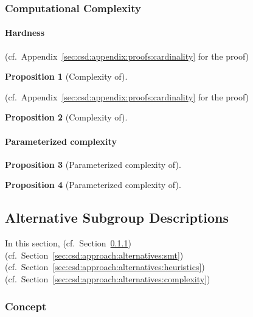 \documentclass{article}
\newtheorem{proposition}{Proposition}
\theoremstyle{definition}
\begin{document}
\subsubsection{Computational Complexity}
\label{sec:csd:approach:cardinality:complexity}

\paragraph{Hardness}

(cf.~Appendix~\ref{sec:csd:appendix:proofs:cardinality} for the proof)

\begin{proposition}[Complexity of]
	\label{prop:csd:complexity-cardinality-perfect-box}
\end{proposition}

(cf.~Appendix~\ref{sec:csd:appendix:proofs:cardinality} for the proof)

\begin{proposition}[Complexity of]
	\label{prop:csd:complexity-cardinality-imperfect-box}
\end{proposition}

\paragraph{Parameterized complexity}

\begin{proposition}[Parameterized complexity of]
	\label{prop:csd:complexity-xp}
\end{proposition}

\begin{proposition}[Parameterized complexity of]
	\label{prop:csd:complexity-cardinality-xp}
\end{proposition}

\subsection{Alternative Subgroup Descriptions}
\label{sec:csd:approach:alternatives}

In this section, (cf.~Section~\ref{sec:csd:approach:alternatives:concept}) (cf.~Section~\ref{sec:csd:approach:alternatives:smt}) (cf.~Section~\ref{sec:csd:approach:alternatives:heuristics}) (cf.~Section~\ref{sec:csd:approach:alternatives:complexity})

\subsubsection{Concept}
\label{sec:csd:approach:alternatives:concept}
\end{document}
